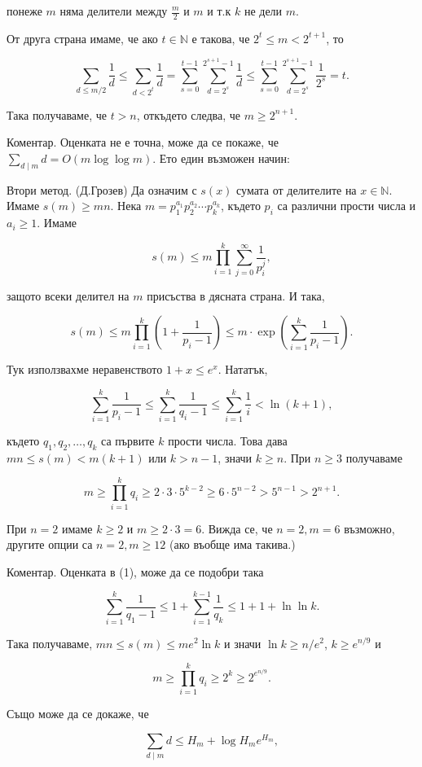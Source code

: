 понеже $m$ няма делители между $\frac m2$ и $m$ и т.к $k$ не дели $m$.

От друга страна имаме, че ако $t\in\mathbb N$ е такова, че $2^t\leq m<2^{t+1}$, то

$$
\sum_{d\leq m/2}\frac1d\leq\sum_{d<2^t}\frac1d
=\sum_{s=0}^{t-1}\sum_{d=2^s}^{2^{s+1}-1}\frac1d
\leq\sum_{s=0}^{t-1}\sum_{d=2^s}^{2^{s+1}-1}\frac1{2^s}=t.
$$

Така получаваме, че $t>n$, откъдето следва, че $m\geq2^{n+1}$.

Коментар. Оценката не е точна, може да се покаже, че $\sum_{d\mid m}d=O(m\log\log m)$. Ето един възможен начин:

Втори метод. (Д.Грозев) Да означим с $s(x)$ сумата от делителите на $x\in\mathbb N$. Имаме $s(m)\geq mn$. Нека $m=p_1^{a_1}p_2^{a_2}\cdots p_k^{a_k}$, където $p_i$ са различни прости числа и $a_i\geq1$. Имаме

$$s(m)\leq m\prod_{i=1}^k\sum_{j=0}^{\infty}\frac1{p_i^j},$$

защото всеки делител на $m$ присъства в дясната страна. И така,

$$s(m)\leq m\prod_{i=1}^k\left(1+\frac1{p_i-1}\right)\leq m\cdot\exp\left(\sum_{i=1}^k\frac1{p_i-1}\right).$$

Тук използвахме неравенството $1+x\leq e^x$. Нататък,

$$\sum_{i=1}^k\frac1{p_i-1}\leq\sum_{i=1}^k\frac1{q_i-1}\leq\sum_{i=1}^k\frac1i<\ln(k+1)\tag{1},$$

където $q_1,q_2,\ldots,q_k$ са първите $k$ прости числа. Това дава $mn\leq s(m)<m(k+1)$ или $k>n-1$, значи $k\geq n$. При $n\geq3$ получаваме

$$m\geq\prod_{i=1}^kq_i\geq2\cdot3\cdot5^{k-2}\geq6\cdot5^{n-2}>5^{n-1}>2^{n+1}.$$

При $n=2$ имаме $k\geq2$ и $m\geq2\cdot3=6$. Вижда се, че $n=2,m=6$ възможно, другите опции са $n=2,m\geq12$ (ако въобще има такива.)

Коментар. Оценката в (1), може да се подобри така

$$\sum_{i=1}^k\frac1{q_1-1}\leq1+\sum_{i=1}^{k-1}\frac1{q_k}\leq1+1+\ln\ln k.$$

Така получаваме, $mn\leq s(m)\leq me^2\ln k$ и значи $\ln k\geq n/e^2$, $k\geq e^{n/9}$ и

$$m\geq\prod_{i=1}^kq_i\geq2^k\geq2^{e^{n/9}}.$$

Също може да се докаже, че

$$\sum_{d\mid m}d\leq H_m+\log H_m e^{H_m},$$

